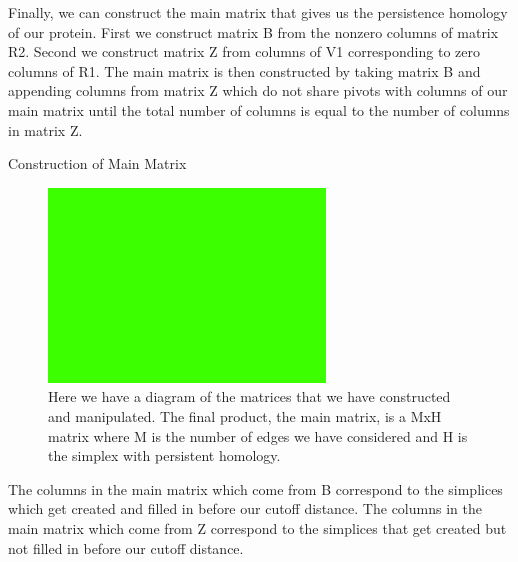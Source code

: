 \documentclass[12pt, a4paper, twocolumn, fullpage]{article}
\theoremstyle{plain}
\theoremstyle{definition}
\theoremstyle{remark}
\begin{document}
Finally, we can construct the main matrix that gives us the persistence homology of our protein. First we construct matrix B from the nonzero columns of matrix R2.  Second we construct matrix Z from columns of V1 corresponding to zero columns of R1. The main matrix is then constructed by taking matrix B and appending columns from matrix Z which do not share pivots with columns of our main matrix until the total number of columns is equal to the number of columns in matrix Z.

\begin{algorithm}
\caption{Construction of Main Matrix}
\begin{algorithmic}
    \ENDIF
    \ENDIF
\ENDFOR
\end{algorithmic}
\end{algorithm}

\begin{figure}[t]
    \includegraphics[width=\linewidth]{img/blank.png}
    \caption{Here we have a diagram of the matrices that we have constructed and manipulated. The final product, the main matrix, is a MxH matrix where M is the number of edges we have considered and H is the simplex with persistent homology.}
    \label{MatricesOfComputeHom}
\end{figure}

The columns in the main matrix which come from B correspond to the simplices which get created and filled in before our cutoff distance. The columns in the main matrix which come from Z correspond to the simplices that get created but not filled in before our cutoff distance.
\end{document}
